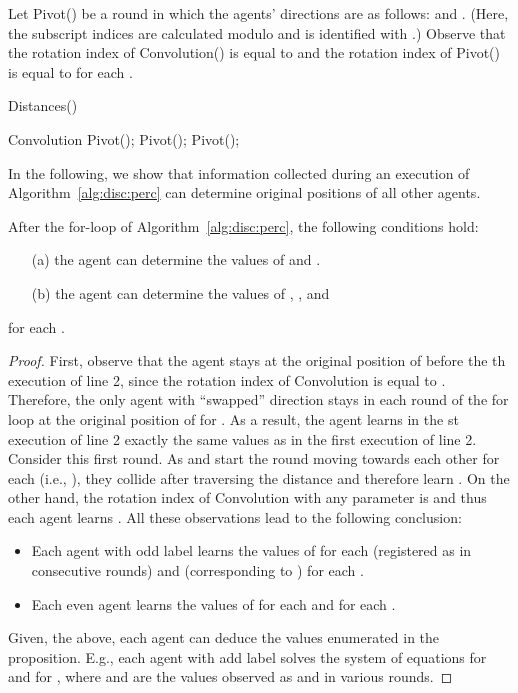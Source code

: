 Let Pivot() be a round in which the agents' directions are as follows:
 and
.
(Here, the subscript indices are calculated modulo  and  is identified
with .)
Observe that the rotation index of Convolution() is equal to  and the rotation
index of Pivot() is equal to  for each .
\begin{algorithm}[]
	\caption{Distances()}
	\label{alg:disc:perc}
	\begin{algorithmic}[1]
    \For{}
        \State Convolution
    \EndFor
    \State Pivot(); Pivot(); Pivot();
    \end{algorithmic}
\end{algorithm}
In the following, we show that information collected during an
execution of Algorithm~\ref{alg:disc:perc} can determine original
positions of all other agents. 
\begin{proposition}\label{prop:linear}
After the for-loop of Algorithm~\ref{alg:disc:perc}, the following
conditions hold:
\begin{enumerate}
\item[(a)]
the agent  can
determine the values of
 and .
\item[(b)]
the agent  can determine the values of
, , and 
\end{enumerate}
for each .
\end{proposition}
\iffull
\begin{proof}
First, observe that
the agent  stays at the original position
of  before the th execution of line 2, since the rotation index
of Convolution is equal to . Therefore, the only agent with ``swapped'' direction
stays in each round of the for loop at the original position of 
for .
As a result, the agent  learns in the st execution of line 2 exactly the same values as 
in the first execution of line 2.
Consider this first round. As  and  start
the round moving towards each other for each  (i.e., ),
they collide after traversing the distance  and therefore learn .
On the other hand, the rotation index of Convolution with any
parameter is  and thus each agent  learns .
All these observations lead to the following conclusion:
\begin{itemize}
\item
Each agent with odd label learns the values of
 for each  (registered as  in consecutive rounds)
and  (corresponding to ) for each .
\item
Each even agent learns the values of
 for each 
and  for each .
\end{itemize}
Given, the above, each agent can deduce the values enumerated
in the proposition.
E.g., each agent with add label solves the 
system of equations  for 
and  for , where  and  are
the values observed as  and  in various rounds.
\end{proof}
